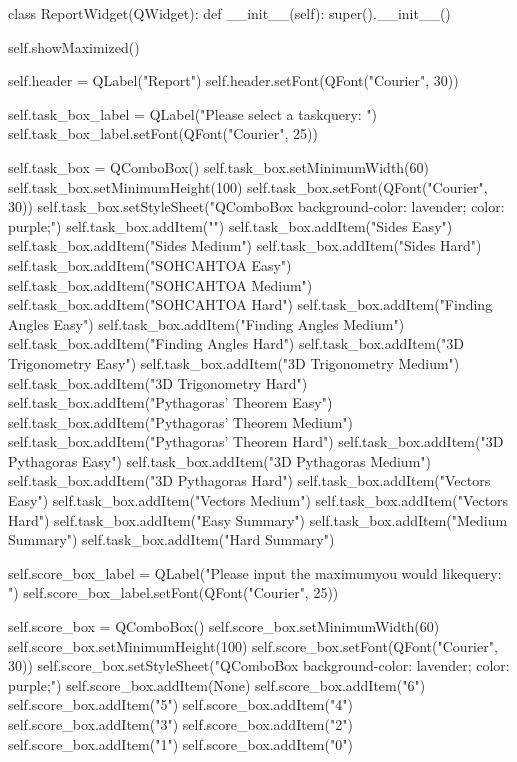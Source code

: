 \begin{python}
class ReportWidget(QWidget):
    def __init__(self):
        super().__init__()

        self.showMaximized()

        self.header = QLabel("Report")
        self.header.setFont(QFont("Courier", 30))

        self.task_box_label = QLabel("Please select a task\nto query: ")
        self.task_box_label.setFont(QFont("Courier", 25))

        self.task_box = QComboBox()
        self.task_box.setMinimumWidth(60)
        self.task_box.setMinimumHeight(100)
        self.task_box.setFont(QFont("Courier", 30))
        self.task_box.setStyleSheet("QComboBox {background-color: lavender; color: purple;}")
        self.task_box.addItem("")
        self.task_box.addItem("Sides Easy")
        self.task_box.addItem("Sides Medium")
        self.task_box.addItem("Sides Hard")
        self.task_box.addItem("SOHCAHTOA Easy")
        self.task_box.addItem("SOHCAHTOA Medium")
        self.task_box.addItem("SOHCAHTOA Hard")
        self.task_box.addItem("Finding Angles Easy")
        self.task_box.addItem("Finding Angles Medium")
        self.task_box.addItem("Finding Angles Hard")
        self.task_box.addItem("3D Trigonometry Easy")
        self.task_box.addItem("3D Trigonometry Medium")
        self.task_box.addItem("3D Trigonometry Hard")
        self.task_box.addItem("Pythagoras' Theorem Easy")
        self.task_box.addItem("Pythagoras' Theorem Medium")
        self.task_box.addItem("Pythagoras' Theorem Hard")
        self.task_box.addItem("3D Pythagoras Easy")
        self.task_box.addItem("3D Pythagoras Medium")
        self.task_box.addItem("3D Pythagoras Hard")
        self.task_box.addItem("Vectors Easy")
        self.task_box.addItem("Vectors Medium")
        self.task_box.addItem("Vectors Hard")
        self.task_box.addItem("Easy Summary")
        self.task_box.addItem("Medium Summary")
        self.task_box.addItem("Hard Summary")
        
        self.score_box_label = QLabel("Please input the maximum\nscore you would like\nto query: ")
        self.score_box_label.setFont(QFont("Courier", 25))

        self.score_box = QComboBox()
        self.score_box.setMinimumWidth(60)
        self.score_box.setMinimumHeight(100)
        self.score_box.setFont(QFont("Courier", 30))
        self.score_box.setStyleSheet("QComboBox {background-color: lavender; color: purple;}")
        self.score_box.addItem(None)
        self.score_box.addItem("6")
        self.score_box.addItem("5")
        self.score_box.addItem("4")
        self.score_box.addItem("3")
        self.score_box.addItem("2")
        self.score_box.addItem("1")
        self.score_box.addItem("0")


\end{python}
